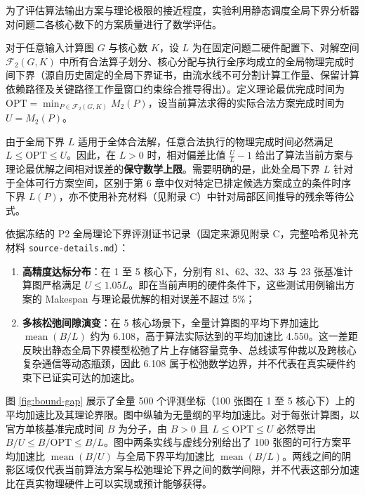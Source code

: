\documentclass[anonymous,withtoc]{gmcm2026}
\providecommand{\tightlist}{\setlength{\itemsep}{0pt}\setlength{\parskip}{0pt}}
\begin{document}
为了评估算法输出方案与理论极限的接近程度，实验利用静态调度全局下界分析器对问题二各核心数下的方案质量进行了数学评估。

对于任意输入计算图 \(G\) 与核心数 \(K\)，设 \(L\) 为在固定问题二硬件配置下、对解空间 \(\mathcal{F}_2(G, K)\) 中所有合法算子划分、核心分配与执行全序均成立的全局物理完成时间下界（源自历史固定的全局下界证书，由流水线不可分割计算工作量、保留计算依赖路径及关键路径工作量窗口约束综合推导得出）。定义理论最优完成时间为 \(\mathrm{OPT} = \min_{P \in \mathcal{F}_2(G, K)} M_2(P)\)，设当前算法求得的实际合法方案完成时间为 \(U = M_2(P)\)。

由于全局下界 \(L\) 适用于全体合法解，任意合法执行的物理完成时间必然满足 \(L \le \mathrm{OPT} \le U\)。因此，在 \(L > 0\) 时，相对偏差比值 \(\frac{U}{L} - 1\) 给出了算法当前方案与理论最优解之间相对误差的\textbf{保守数学上限}。需要明确的是，此处全局下界 \(L\) 针对于全体可行方案空间，区别于第 6 章中仅对特定已排定候选方案成立的条件时序下界 \(L(P)\)，亦不使用补充材料（见附录 C）中针对局部区间推导的残余等待公式。

依据冻结的 P2 全局理论下界评测证书记录（固定来源见附录 C，完整哈希见补充材料 \texttt{source-details.md}）：

\begin{enumerate}
\def\labelenumi{\arabic{enumi}.}
\tightlist
\item
  \textbf{高精度达标分布}：在 1 至 5 核心下，分别有 81、62、32、33 与 23 张基准计算图严格满足 \(U \le 1.05 L\)。即在当前声明的硬件条件下，这些测试用例输出方案的 Makespan 与理论最优解的相对误差不超过 5\%；
\item
  \textbf{多核松弛间隙演变}：在 5 核心场景下，全量计算图的平均下界加速比 \(\operatorname{mean}(B/L)\) 约为 6.108，高于算法实际达到的平均加速比 4.550。这一差距反映出静态全局下界模型松弛了片上存储容量竞争、总线读写仲裁以及跨核心复杂通信等动态瓶颈，因此 6.108 属于松弛数学边界，并不代表在真实硬件约束下已证实可达的加速比。
\end{enumerate}

图 \ref{fig:bound-gap} 展示了全量 500 个评测坐标（100 张图在 1 至 5 核心下）上的平均加速比及其理论界限。图中纵轴为无量纲的平均加速比。对于每张计算图，以官方单核基准完成时间 \(B\) 为分子，由 \(B > 0\) 且 \(L \le \mathrm{OPT} \le U\) 必然导出 \(B/U \le B/\mathrm{OPT} \le B/L\)。图中两条实线与虚线分别给出了 100 张图的可行方案平均加速比 \(\operatorname{mean}(B/U)\) 与全局下界平均加速比 \(\operatorname{mean}(B/L)\)。两线之间的阴影区域仅代表当前算法方案与松弛理论下界之间的数学间隙，并不代表这部分加速比在真实物理硬件上可以实现或预计能够获得。
\end{document}
